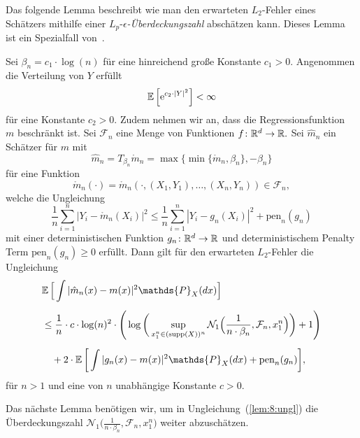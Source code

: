 Das folgende Lemma beschreibt wie man den erwarteten $L_2$-Fehler eines Schätzers mithilfe einer $L_p$-$\epsilon$\textit{-Überdeckungszahl} abschätzen kann. Dieses Lemma ist ein Spezialfall von~\cite[Lemma 8]{kohler19}.
  \begin{lem}
  \label{lem:8}
Sei $\beta_n = c_1 \cdot \log(n)$ für eine hinreichend große Konstante $c_1 > 0$. Angenommen die Verteilung von $Y$ erfüllt 
$$ \mathbb{E}\,\Big[\mathrm{e}^{c_2 \cdot |Y|^2}\Big] < \infty$$
für eine Konstante $c_2 > 0.$ Zudem nehmen wir an, dass die Regressionsfunktion~$m$ beschränkt ist. Sei $\mathcal{F}_n$ eine Menge von Funktionen $f\colon \mathbb{R}^d \to \mathbb{R}.$ Sei $\hat{m}_n$ ein Schätzer für $m$ mit
$$\hat{m}_n = T_{\beta_n}\mathring{m}_n = \max\big\{\min\{\mathring{m}_n, \beta_n\}, -\beta_n\big\}$$ 
für eine Funktion
$$\mathring{m}_n(\cdot) = \mathring{m}_n(\cdot,(X_1, Y_1),\dots,(X_n, Y_n)) \in \mathcal{F}_n,$$
welche die Ungleichung
\begin{equation}
\label{lem:8:bed:1}
\frac{1}{n} \sum_{i = 1}^n |Y_i - \mathring{m}_n(X_i)|^2 \leq \frac{1}{n}\sum_{i = 1}^n |Y_i - g_{n}(X_i)|^2 + \mathrm{pen}_n(g_n)
\end{equation}
mit einer deterministischen Funktion $g_{n}\colon \mathbb{R}^d \to \mathbb{R}$ und deterministischem Penalty Term $\mathrm{pen}_n(g_{n}) \geq 0$ erfüllt.
Dann gilt für den erwarteten $L_2$-Fehler die Ungleichung
\begin{equation}
\label{lem:8:ungl}
\begin{split}
& \E \Big[\int |\hat{m}_n(x) - m(x)|^2 \mathds{P}_X(dx)\Big] \\[0.5em]
& \leq \frac{1}{n} \cdot c \cdot \log(n)^2 \cdot \Bigg(\log\bigg(\sup_{x_1^n \in (\supp(X))^n}\mathcal{N}_1\Big(\frac{1}{n \cdot \beta_n},\mathcal{F}_n,x_1^n\Big)\bigg) + 1\Bigg) \\[0.5em]
& \quad + 2 \cdot \E\bigg[\int |g_{n}(x) - m(x)|^2 \mathds{P}_X(dx) + \mathrm{pen}_n(g_{n})\bigg],
\end{split}
\end{equation}
für $n > 1$ und eine von $n$ unabhängige Konstante $c > 0$.
  \end{lem}
Das nächste Lemma benötigen wir, um in Ungleichung~(\ref{lem:8:ungl}) die Überdeckungszahl $\mathcal{N}_1\big(\frac{1}{n \cdot \beta_n},\mathcal{F}_n,x_1^n\big)$ weiter abzuschätzen.
